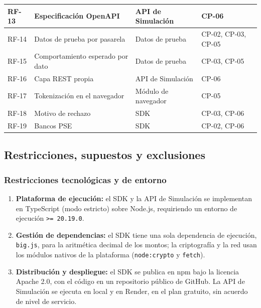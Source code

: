 {\begin{longtable}{|>{\raggedright\arraybackslash}p{1.2cm}|>{\raggedright\arraybackslash}p{4.8cm}|>{\raggedright\arraybackslash}p{3.2cm}|>{\raggedright\arraybackslash}p{4.5cm}|}
RF-13 & Especificación OpenAPI & API de Simulación & CP-06 \\ \hline
RF-14 & Datos de prueba por pasarela & Datos de prueba & CP-02, CP-03, CP-05 \\ \hline
RF-15 & Comportamiento esperado por dato & Datos de prueba & CP-03, CP-05 \\ \hline
RF-16 & Capa REST propia & API de Simulación & CP-06 \\ \hline
RF-17 & Tokenización en el navegador & Módulo de navegador & CP-05 \\ \hline
RF-18 & Motivo de rechazo & SDK & CP-03, CP-06 \\ \hline
RF-19 & Bancos PSE & SDK & CP-02, CP-06 \\ \hline
\end{longtable}
}

\subsection{Restricciones, supuestos y exclusiones}

\subsubsection{Restricciones tecnológicas y de entorno}
\begin{enumerate}
    \item \textbf{Plataforma de ejecución:} el SDK y la API de Simulación se implementan en TypeScript (modo estricto) sobre Node.js, requiriendo un entorno de ejecución \texttt{>= 20.19.0}.
    \item \textbf{Gestión de dependencias:} el SDK tiene una sola dependencia de ejecución, \texttt{big.js}, para la aritmética decimal de los montos; la criptografía y la red usan los módulos nativos de la plataforma (\texttt{node:crypto} y \texttt{fetch}).
    \item \textbf{Distribución y despliegue:} el SDK se publica en npm bajo la licencia Apache 2.0, con el código en un repositorio público de GitHub. La API de Simulación se ejecuta en local y en Render, en el plan gratuito, sin acuerdo de nivel de servicio.
\end{enumerate}

